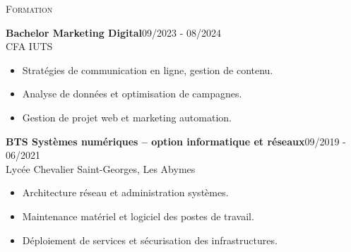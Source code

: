 \documentclass[11pt,a4paper]{article}
\newcommand{\headright}[1]{\vspace*{2.5ex}\textsc{\Large\color{cvblue}#1}\par%
  \vspace*{-2ex}{\color{cvblue}\hrulefill}\par}
\begin{document}
\begin{minipage}[t]{0.56\textwidth}
  \headright{Formation}
  \colorbox{maincolor}{%
  \begin{minipage}{\linewidth}
    \noindent
    \textbf{Bachelor Marketing Digital}\hfill 09/2023 - 08/2024\\
    CFA IUTS\\[-0.3em]
    \begin{itemize}[leftmargin=*]
      \item Stratégies de communication en ligne, gestion de contenu. \item Analyse de données et optimisation de campagnes. \item Gestion de projet web et marketing automation.
    \end{itemize}
  \end{minipage}}

\vspace{3mm}

\colorbox{maincolor}{%
  \begin{minipage}{\linewidth}
    \noindent
    \textbf{BTS Systèmes numériques – option informatique et réseaux}\hfill 09/2019 - 06/2021\\
    Lycée Chevalier Saint-Georges, Les Abymes\\[-0.3em]
    \begin{itemize}[leftmargin=*]
      \item Architecture réseau et administration systèmes. \item Maintenance matériel et logiciel des postes de travail. \item Déploiement de services et sécurisation des infrastructures.
    \end{itemize}
  \end{minipage}}

\end{minipage}
\end{document}
